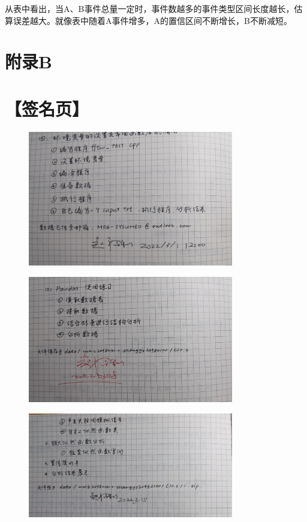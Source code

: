 \documentclass[10pt,a4paper,twoside,UTF8]{ctexart}
\begin{document}
从表中看出，当A、B事件总量一定时，事件数越多的事件类型区间长度越长，估算误差越大。就像表中随着A事件增多，A的置信区间不断增长，B不断减短。

\newpage
\section*{\LARGE 附录B}
\section*{【签名页】}
\begin{figure}[htbp]
	\centering
	\includegraphics[width=0.8\textwidth]{img//sig_1.jpg}
	\label{fig:sig_1}
\end{figure}
\begin{figure}[htbp]
	\centering
	\includegraphics[width=0.8\textwidth]{img//sig_2.jpg}
	\label{fig:sig_2}
\end{figure}
\begin{figure}[htbp]
	\centering
	\includegraphics[width=0.8\textwidth]{img//sig_3.jpg}
	\label{fig:sig_3}
\end{figure}
\end{document}
